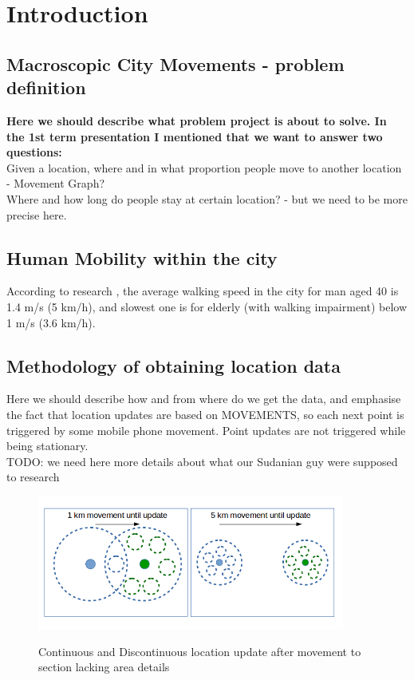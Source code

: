 \chapter{Introduction}
\label{cha:introduction}

\section{Macroscopic City Movements - problem definition}
\label{cha:introduction_probdef}

\textbf{Here we should describe what problem project is about to solve. In the 1st term presentation I mentioned that we want to answer two questions:
}\\
 
Given a location, where and in what proportion people move to another location - Movement Graph? 
\\
Where and how long do people stay at certain location? - but we need to be more precise here.

\FloatBarrier

\section{Human Mobility within the city}
\label{cha:introduction_hummob}

According to research \cite{HumanMobility1}\cite{HumanMobility2}\cite{HumanMobility3}, the average walking speed in the city for man aged 40 is 1.4 m/s (5 km/h), and slowest one is for elderly (with walking impairment) below 1 m/s (3.6 km/h). 

\FloatBarrier

\section{Methodology of obtaining location data}
\label{cha:introduction_methodo}

Here we should describe how and from where do we get the data, and emphasise the fact that location updates are based on MOVEMENTS, so each next point is triggered by some mobile phone movement. Point updates are not triggered while being stationary.
\\
TODO: we need here more details about what our Sudanian guy were supposed to research
\begin{figure}[!ht]
	\centering
	\includegraphics[width=0.9\textwidth]{images/movement_update.png}\\
	\caption{Continuous and Discontinuous location update after movement to section lacking area details  }
	\label{fig:introduction_movement_update}
\end{figure}
\FloatBarrier

